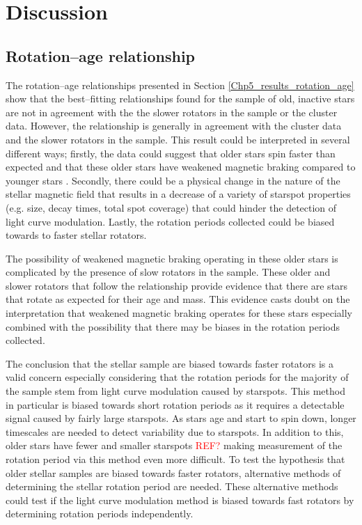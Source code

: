 \section{Discussion}

\subsection{Rotation--age relationship}
The rotation--age relationships presented in Section \ref{Chp5_results_rotation_age} show that the best--fitting relationships found for the sample of old, inactive stars are not in agreement with the the slower rotators in the sample or the cluster data. However, the \citet{Barnes_2007} relationship is generally in agreement with the cluster data and the slower rotators in the sample. This result could be interpreted in several different ways; firstly, the data could suggest that older stars spin faster than expected and that these older stars have weakened magnetic braking compared to younger stars \citep{van_Saders_etal_2016}. Secondly, there could be a physical change in the nature of the stellar magnetic field that results in a decrease of a variety of starspot properties (e.g. size, decay times, total spot coverage) that could hinder the detection of light curve modulation. Lastly, the rotation periods collected could be biased towards to faster stellar rotators.

The possibility of weakened magnetic braking operating in these older stars is complicated by the presence of slow rotators in the sample. These older and slower rotators that follow the \citet{Barnes_2007} relationship provide evidence that there are stars that rotate as expected for their age and mass. This evidence casts doubt on the interpretation that weakened magnetic braking operates for these stars especially combined with the possibility that there may be biases in the rotation periods collected.

The conclusion that the stellar sample are biased towards faster rotators is a valid concern especially considering that the rotation periods for the majority of the sample stem from light curve modulation caused by starspots. This method in particular is biased towards short rotation periods as it requires a detectable signal caused by fairly large starspots. As stars age and start to spin down, longer timescales are needed to detect variability due to starspots. In addition to this, older stars have fewer and smaller starspots \textcolor{red}{REF?} making measurement of the rotation period via this method even more difficult. To test the hypothesis that older stellar samples are biased towards faster rotators, alternative methods of determining the stellar rotation period are needed. These alternative methods could test if the light curve modulation method is biased towards fast rotators by determining rotation periods independently.

